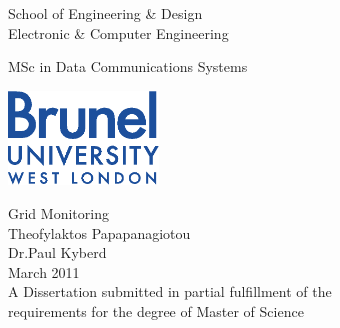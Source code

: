 
\thispagestyle{empty}

\begin{center}
\Large
School of Engineering \& Design\\
Electronic \& Computer Engineering\\
\vspace{1\baselineskip}

MSc in Data Communications Systems\\
\vspace{1\baselineskip}

\begin{center}
\includegraphics[width=40mm]{images/brunel_logo.eps}\\
\end{center}
\vspace{0.5\baselineskip}

\Huge
Grid Monitoring\\
\vspace{1.5\baselineskip}
\Huge
Theofylaktos Papapanagiotou\\
Dr.Paul Kyberd\\
\vspace{1\baselineskip}
\large
March 2011\\
\vspace{0.5\baselineskip}
\large
A Dissertation submitted in partial fulfillment of the\\
requirements for the degree of Master of Science
\end{center}
